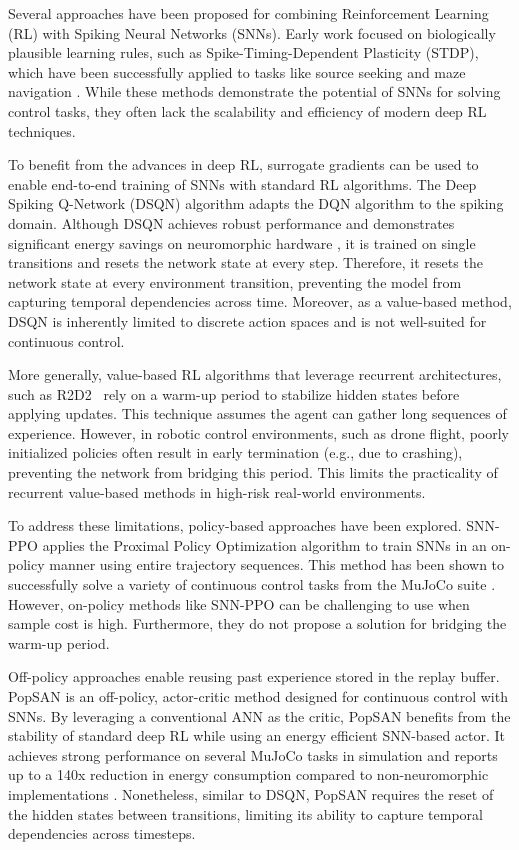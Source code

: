 Several approaches have been proposed for combining Reinforcement Learning (RL) with Spiking Neural Networks (SNNs). Early work focused on biologically plausible learning rules, such as Spike-Timing-Dependent Plasticity (STDP), which have been successfully applied to tasks like source seeking \cite{Florian2005} and maze navigation \cite{fremaux2013spiking}. While these methods demonstrate the potential of SNNs for solving control tasks, they often lack the scalability and efficiency of modern deep RL techniques. 

To benefit from the advances in deep RL, surrogate gradients can be used to enable end-to-end training of SNNs with standard RL algorithms. The Deep Spiking Q-Network (DSQN) algorithm \cite{Chen2022} adapts the DQN algorithm \cite{mnih2013playingatarideepreinforcement} to the spiking domain. Although DSQN achieves robust performance and demonstrates significant energy savings on neuromorphic hardware \cite{akl2021porting}, it is trained on single transitions and resets the network state at every step. Therefore, it resets the network state at every environment transition, preventing the model from capturing temporal dependencies across time. Moreover, as a value-based method, DSQN is inherently limited to discrete action spaces and is not well-suited for continuous control.

More generally, value-based RL algorithms that leverage recurrent architectures, such as R2D2~\cite{Kapturowski2019} rely on a warm-up period to stabilize hidden states before applying updates. This technique assumes the agent can gather long sequences of experience. However, in robotic control environments, such as drone flight, poorly initialized policies often result in early termination (e.g., due to crashing), preventing the network from bridging this period. This limits the practicality of recurrent value-based methods in high-risk real-world environments.

To address these limitations, policy-based approaches have been explored. SNN-PPO \cite{zanatta2024exploring} applies the Proximal Policy Optimization algorithm to train SNNs in an on-policy manner using entire trajectory sequences. This method has been shown to successfully solve a variety of continuous control tasks from the MuJoCo suite \cite{mujoco}. However, on-policy methods like SNN-PPO can be challenging to use when sample cost is high. Furthermore, they do not propose a solution for bridging the warm-up period.

Off-policy approaches enable reusing past experience stored in the replay buffer. PopSAN \cite{Tang2020} is an off-policy, actor-critic method designed for continuous control with SNNs. By leveraging a conventional ANN as the critic, PopSAN benefits from the stability of standard deep RL while using an energy efficient SNN-based actor. It achieves strong performance on several MuJoCo tasks in simulation and reports up to a 140x reduction in energy consumption compared to non-neuromorphic implementations \cite{Tang2020_Hardware}. Nonetheless, similar to DSQN, PopSAN requires the reset of the hidden states between transitions, limiting its ability to capture temporal dependencies across timesteps.


